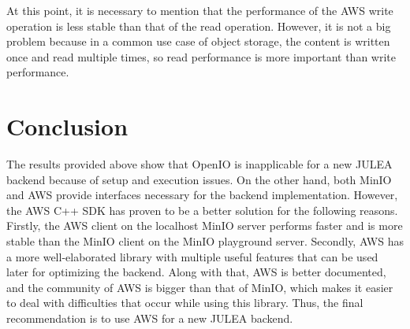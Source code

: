 \documentclass[conference]{IEEEtran}
\begin{document}
At this point, it is necessary to mention that the performance of the AWS write operation is less stable than that of the read operation. However, it is not a big problem because in a common use case of object storage, the content is written once and read multiple times, so read performance is more important than write performance. 

\section{Conclusion}
The results provided above show that OpenIO is inapplicable for a new JULEA backend because of setup and execution issues. On the other hand, both MinIO and AWS provide interfaces necessary for the backend implementation. However, the AWS C++ SDK has proven to be a better solution for the following reasons. Firstly, the AWS client on the localhost MinIO server performs faster and is more stable than the MinIO client on the MinIO playground server. Secondly, AWS has a more well-elaborated library with multiple useful features that can be used later for optimizing the backend. Along with that, AWS is better documented, and the community of AWS is bigger than that of MinIO, which makes it easier to deal with difficulties that occur while using this library. Thus, the final recommendation is to use AWS for a new JULEA backend. 






\end{document}
